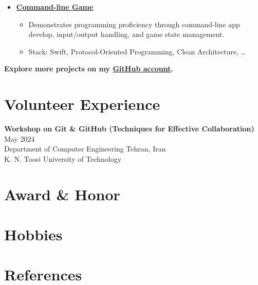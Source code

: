 \documentclass[letter,12pt]{article}
\newcommand{\customsquare}{\raisebox{0.25ex}{\scalebox{0.45}{$\blacksquare$}}}
\begin{document}
\begin{itemize}[label={\customsquare}]
    \item \href{https://github.com/nsswifter/CommandLineGameh}{\underline{\textbf{Command-line Game}}}
    \begin{itemize}
        \item Demonstrates programming proficiency through command-line app develop, input/output handling, and game state management.
        \item Stack: Swift, Protocol-Oriented Programming, Clean Architecture, …
    \end{itemize}
\end{itemize}

\small \textbf{Explore more projects on my \href{https://github.com/nsswifter}{\underline{GitHub account}}.}

\section*{Volunteer Experience}
\textbf{Workshop on Git \& GitHub (Techniques for Effective Collaboration)} \hfill May 2024 \\ [4pt]
Department of Computer Engineering \hfill Tehran, Iran \\
K. N. Toosi University of Technology 

\pagebreak

\section*{Award & Honor}

\section*{Hobbies}

\section*{References}
\end{document}
